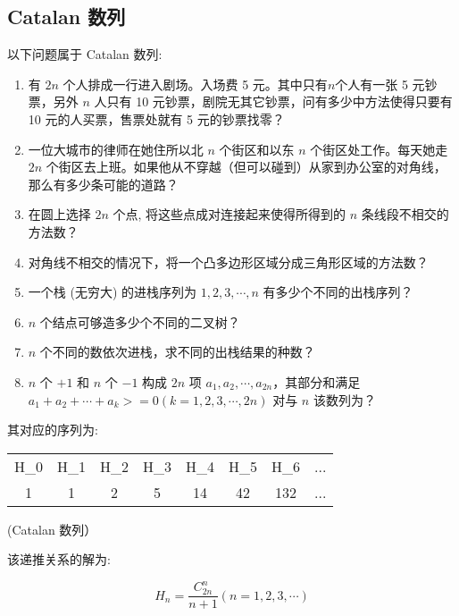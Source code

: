 
\subsection{Catalan 数列}

以下问题属于 Catalan 数列:

\begin{enumerate}
\item 有 $2n$ 个人排成一行进入剧场。入场费 5 元。其中只有$n$个人有一张 5 元钞票，另外 $n$ 人只有 10 元钞票，剧院无其它钞票，问有多少中方法使得只要有 10 元的人买票，售票处就有 5 元的钞票找零？
\item 一位大城市的律师在她住所以北 $n$ 个街区和以东 $n$ 个街区处工作。每天她走 $2n$ 个街区去上班。如果他从不穿越（但可以碰到）从家到办公室的对角线，那么有多少条可能的道路？
\item 在圆上选择 $2n$ 个点, 将这些点成对连接起来使得所得到的 $n$ 条线段不相交的方法数？
\item 对角线不相交的情况下，将一个凸多边形区域分成三角形区域的方法数？
\item 一个栈 (无穷大) 的进栈序列为 $1,2,3, \cdots ,n$ 有多少个不同的出栈序列？
\item $n$ 个结点可够造多少个不同的二叉树？
\item $n$ 个不同的数依次进栈，求不同的出栈结果的种数？
\item $n$ 个 $+1$ 和 $n$ 个 $-1$ 构成 $2n$ 项 $a_1,a_2, \cdots ,a_{2n}$，其部分和满足 $a_1+a_2+ \cdots +a_k>=0(k=1,2,3, \cdots ,2n)$ 对与 $n$ 该数列为？
\end{enumerate}

其对应的序列为:

\begin{tabular}{cccccccc}
\hline
H_0& H_1& H_2& H_3& H_4& H_5& H_6& ...\\1& 1& 2& 5& 14& 42& 132& ...\\\hline
\end{tabular}

(Catalan 数列）

该递推关系的解为:

$$
H_n=\frac{C_{2n}^{n}}{n+1}(n=1,2,3,\cdots)
$$
